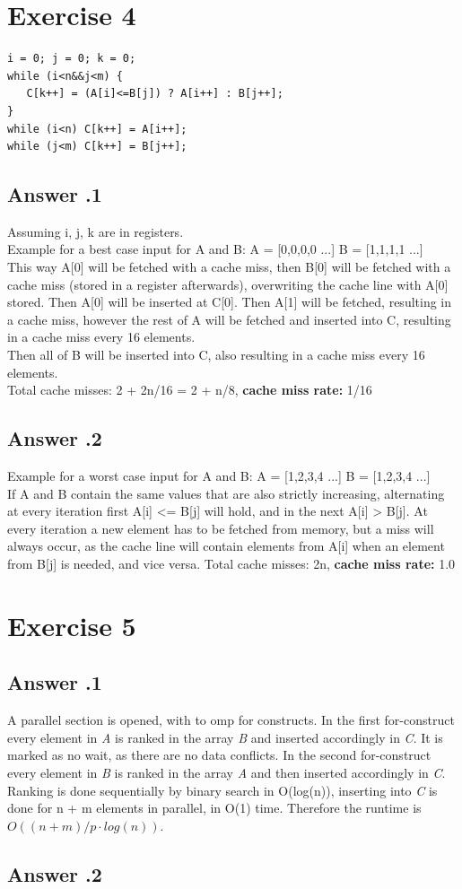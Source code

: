 \documentclass[a4paper,%
11pt,%
DIV=12,
headsepline,%
headings=normal,
]{scrartcl}
\newcounter{curex}
\newcommand{\exercise}[1]{\section*{Exercise #1}\setcounter{curex}{#1}}
\newcommand{\answer}[1]{\subsection*{Answer \arabic{curex}.#1}}
\begin{document}
\exercise{4}

\begin{lstlisting}
i = 0; j = 0; k = 0; 
while (i<n&&j<m) {
   C[k++] = (A[i]<=B[j]) ? A[i++] : B[j++]; 
}
while (i<n) C[k++] = A[i++]; 
while (j<m) C[k++] = B[j++];
\end{lstlisting}

\answer{1}
Assuming i, j, k are in registers. \\
Example for a best case input for A and B:
A = [0,0,0,0 ...] 
B = [1,1,1,1 ...] \\
This way A[0] will be fetched with a cache miss, then B[0] will be fetched with a cache miss (stored in a register afterwards), overwriting the cache line with A[0] stored. Then A[0] will be inserted at C[0].
Then A[1] will be fetched, resulting in a cache miss, however the rest of A will be fetched and inserted into C, resulting in a cache miss every 16 elements. \\
Then all of B will be inserted into C, also resulting in a cache miss every 16 elements. \\
Total cache misses: 2 + 2n/16 = 2 + n/8, \textbf{cache miss rate:} 1/16

\answer{2}
Example for a worst case input for A and B:
A = [1,2,3,4 ...] 
B = [1,2,3,4 ...] \\
If A and B contain the same values that are also strictly increasing, alternating at every iteration first A[i] <= B[j] will hold, and in the next A[i] > B[j]. At every iteration a new element has to be fetched from memory, but a miss will always occur, as the cache line will contain elements from A[i] when an element from B[j] is needed, and vice versa.  
Total cache misses: 2n, \textbf{cache miss rate:} 1.0

\exercise{5}

\answer{1}
A parallel section is opened, with to omp for constructs. In the first for-construct every element in \emph{A} is ranked in the array \emph{B} and inserted accordingly in \emph{C}. It is marked as no wait, as there are no data conflicts. In the second for-construct every element in \emph{B} is ranked in the array \emph{A} and then inserted accordingly in \emph{C}. Ranking is done sequentially by binary search in O(log(n)), inserting into \emph{C} is done for n + m elements in parallel, in O(1) time. Therefore the runtime is $ O((n + m)/p \cdot log(n))$.


\answer{2}

\end{document}
